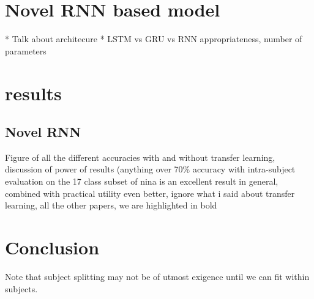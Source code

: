 \documentclass{llncs}
\begin{document}
 \section{Novel RNN based model}
 * Talk about architecure
 * LSTM vs GRU vs RNN appropriateness, number of parameters
 \section{results}
 \subsection{Novel RNN}
 Figure of all the different accuracies with and without transfer learning, discussion of power of results (anything over 70\% accuracy with intra-subject evaluation on the 17 class subset of nina is an excellent result in general, combined with practical utility even better, ignore what i said about transfer learning, all the other papers, we are highlighted in bold
\section{Conclusion} 
Note that subject splitting may not be of utmost exigence until we can fit within subjects.

 
 
%
\end{document}
